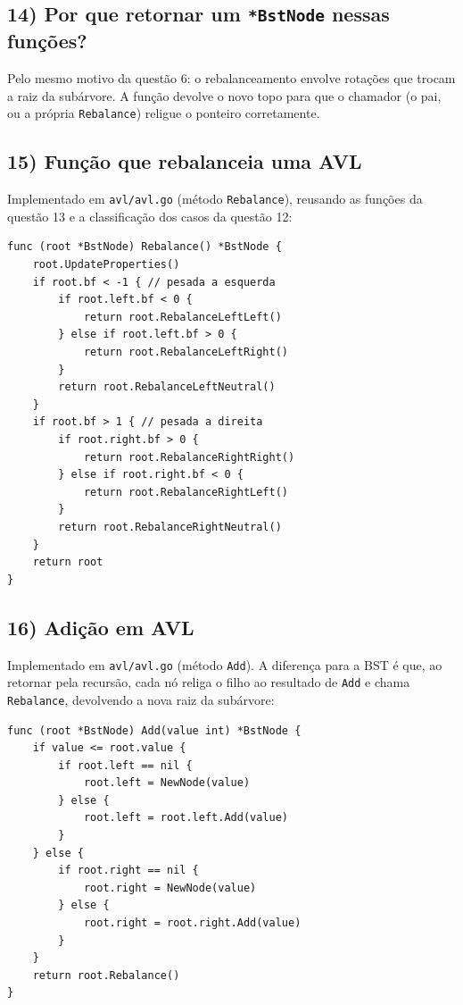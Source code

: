 \documentclass[11pt,a4paper]{article}
\begin{document}
\subsection*{14) Por que retornar um \texttt{*BstNode} nessas funções?}
Pelo mesmo motivo da questão 6: o rebalanceamento envolve rotações que trocam a raiz da
subárvore. A função devolve o novo topo para que o chamador (o pai, ou a própria \texttt{Rebalance})
religue o ponteiro corretamente.

\subsection*{15) Função que rebalanceia uma AVL}
Implementado em \texttt{avl/avl.go} (método \texttt{Rebalance}), reusando as funções da
questão 13 e a classificação dos casos da questão 12:
\begin{lstlisting}
func (root *BstNode) Rebalance() *BstNode {
    root.UpdateProperties()
    if root.bf < -1 { // pesada a esquerda
        if root.left.bf < 0 {
            return root.RebalanceLeftLeft()
        } else if root.left.bf > 0 {
            return root.RebalanceLeftRight()
        }
        return root.RebalanceLeftNeutral()
    }
    if root.bf > 1 { // pesada a direita
        if root.right.bf > 0 {
            return root.RebalanceRightRight()
        } else if root.right.bf < 0 {
            return root.RebalanceRightLeft()
        }
        return root.RebalanceRightNeutral()
    }
    return root
}
\end{lstlisting}

\subsection*{16) Adição em AVL}
Implementado em \texttt{avl/avl.go} (método \texttt{Add}). A diferença para a BST é que, ao
retornar pela recursão, cada nó religa o filho ao resultado de \texttt{Add} e chama
\texttt{Rebalance}, devolvendo a nova raiz da subárvore:
\begin{lstlisting}
func (root *BstNode) Add(value int) *BstNode {
    if value <= root.value {
        if root.left == nil {
            root.left = NewNode(value)
        } else {
            root.left = root.left.Add(value)
        }
    } else {
        if root.right == nil {
            root.right = NewNode(value)
        } else {
            root.right = root.right.Add(value)
        }
    }
    return root.Rebalance()
}
\end{lstlisting}
\end{document}
